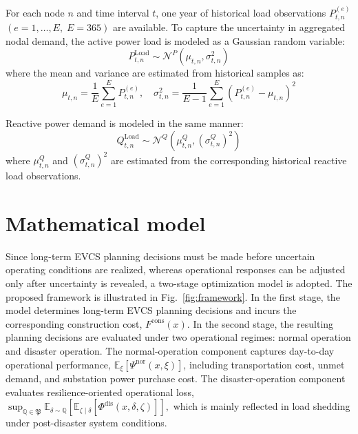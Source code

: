 \documentclass[journal]{IEEEtran}
\providecommand{\1}{\mathbf{1}}
\begin{document}
For each node $n$ and time interval $t$, one year of historical load observations
$P^{(e)}_{t,n}$ $(e=1,\dots,E,\;E=365)$ are available. To capture the uncertainty in aggregated nodal demand, the active power load is modeled as a Gaussian random variable:
\begin{equation}
P^{\mathrm{Load}}_{t,n} \sim \mathcal{N}^P(\mu_{t,n}, \sigma_{t,n}^2)
\end{equation}
where the mean and variance are estimated from historical samples as:
\begin{equation}
\mu_{t,n}=\frac{1}{E}\sum_{e=1}^{E} P^{(e)}_{t,n}, \quad
\sigma_{t,n}^2=\frac{1}{E-1}\sum_{e=1}^{E}\left(P^{(e)}_{t,n}-\mu_{t,n}\right)^2
\end{equation}

Reactive power demand is modeled in the same manner:
\begin{equation}
Q^{\mathrm{Load}}_{t,n} \sim \mathcal{N}^Q(\mu^{Q}_{t,n}, (\sigma^{Q}_{t,n})^2)
\end{equation}
where 
$\mu^{Q}_{t,n}$
 and 
$(\sigma^{Q}_{t,n})^2$
 are estimated from the corresponding historical reactive load observations.



\section{Mathematical model}


Since long-term EVCS planning decisions must be made before uncertain operating conditions are realized, whereas operational responses can be adjusted only after uncertainty is revealed, a two-stage optimization model is adopted. The proposed framework is illustrated in Fig.~\ref{fig:framework}. In the first stage, the model determines long-term EVCS planning decisions and incurs the corresponding construction cost, $F^{\mathrm{cons}}(x)$. In the second stage, the resulting planning decisions are evaluated under two operational regimes: normal operation and disaster operation. The normal-operation component captures day-to-day operational performance, $\mathbb{E}_{\xi}\!\left[\Psi^{\mathrm{nor}}(x,\xi)\right]$, including transportation cost, unmet demand, and substation power purchase cost. The disaster-operation component evaluates resilience-oriented operational loss,
\(
\sup_{\mathbb{Q}\in\mathfrak{P}}
\mathbb{E}_{\delta\sim\mathbb{Q}}
\left[
\mathbb{E}_{\zeta \mid \delta}\!\left[\Phi^{\mathrm{dis}}(x,\delta,\zeta)\right]
\right],
\)
which is mainly reflected in load shedding under post-disaster system conditions.
\end{document}
